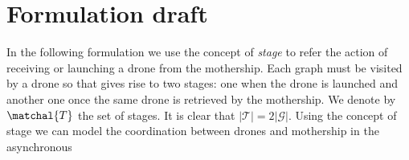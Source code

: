 
\section{Formulation draft}
In the following formulation we use the concept of \emph{stage} to refer the action of receiving or launching a drone from the mothership. Each graph must be visited by a drone so that  gives rise to two stages: one when the drone is launched and another one once the same drone is retrieved by the mothership. We denote by $\matchal{T}$ the set of stages. It is clear that $|\mathcal{T}|=2|\mathcal{G}|$. Using the concept of stage we can  model the coordination between drones and mothership in the asynchronous  

